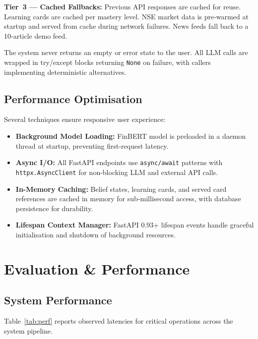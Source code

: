 \documentclass[conference]{IEEEtran}
\begin{document}
\textbf{Tier~3 --- Cached Fallbacks:} Previous API responses are cached for reuse. Learning cards are cached per mastery level. NSE market data is pre-warmed at startup and served from cache during network failures. News feeds fall back to a 10-article demo feed.

The system never returns an empty or error state to the user. All LLM calls are wrapped in try/except blocks returning \texttt{None} on failure, with callers implementing deterministic alternatives.

\subsection{Performance Optimisation}

Several techniques ensure responsive user experience:
\begin{itemize}[leftmargin=*]
  \item \textbf{Background Model Loading:} FinBERT model is preloaded in a daemon thread at startup, preventing first-request latency.
  \item \textbf{Async I/O:} All FastAPI endpoints use \texttt{async/await} patterns with \texttt{httpx.AsyncClient} for non-blocking LLM and external API calls.
  \item \textbf{In-Memory Caching:} Belief states, learning cards, and served card references are cached in memory for sub-millisecond access, with database persistence for durability.
  \item \textbf{Lifespan Context Manager:} FastAPI 0.93+ lifespan events handle graceful initialisation and shutdown of background resources.
\end{itemize}

\section{Evaluation \& Performance}

\subsection{System Performance}

Table~\ref{tab:perf} reports observed latencies for critical operations across the system pipeline.
\end{document}
